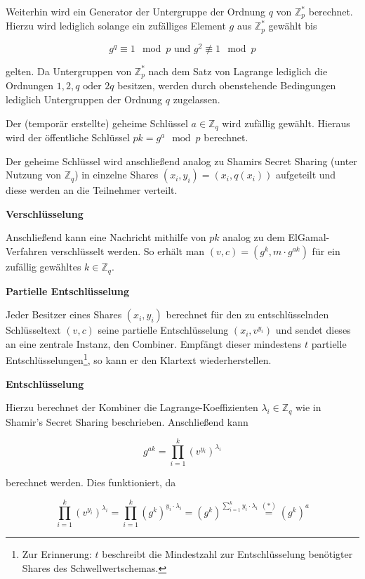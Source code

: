 Weiterhin wird ein Generator der Untergruppe der Ordnung \(q\) von \(\mathbb{Z}_p^*\) berechnet. Hierzu wird lediglich solange ein zufälliges Element \(g\) aus \(\mathbb{Z}_p^*\) gewählt bis 

\[g^q \equiv 1 \mod p \text{ und } g^2 \not\equiv 1 \mod p\] 

gelten. Da Untergruppen von \(\mathbb{Z}_p^*\) nach dem Satz von Lagrange lediglich die Ordnungen \(1,2,q \text{ oder } 2q\) besitzen, werden durch obenstehende Bedingungen lediglich Untergruppen der Ordnung \(q\) zugelassen.

Der (temporär erstellte) geheime Schlüssel \(a \in \mathbb{Z}_q\) wird zufällig gewählt. Hieraus wird der öffentliche Schlüssel \(pk = g^a \mod p\) berechnet.

Der geheime Schlüssel wird anschließend analog zu Shamirs Secret Sharing (unter Nutzung von \(\mathbb{Z}_q\)) in einzelne Shares \((x_i, y_i) = (x_i, q(x_i))\) aufgeteilt und diese werden an die Teilnehmer verteilt. 

\textbf{Verschlüsselung}

Anschließend kann eine Nachricht mithilfe von \(pk\) analog zu dem ElGamal-Verfahren verschlüsselt werden.  So erhält man \((v,c) = (g^k, m \cdot g^{ak})\) für ein zufällig gewähltes \(k \in \mathbb{Z}_q\).

\textbf{Partielle Entschlüsselung}

Jeder Besitzer eines Shares \((x_i, y_i)\) berechnet für den zu entschlüsselnden Schlüsseltext \((v,c)\) seine partielle Entschlüsselung \((x_i, v^{y_i})\) und sendet dieses an eine zentrale Instanz, den Combiner. Empfängt dieser mindestens \(t\) partielle Entschlüsselungen\footnote{
  Zur Erinnerung: \(t\) beschreibt die Mindestzahl zur Entschlüsselung benötigter Shares des Schwellwertschemas.
}, so kann er den Klartext wiederherstellen.

\textbf{Entschlüsselung}

Hierzu berechnet der Kombiner die Lagrange-Koeffizienten \(\lambda_i \in \mathbb{Z}_q\) wie in Shamir's Secret Sharing beschrieben. Anschließend kann
 
\[g^{ak} = \prod_{i=1}^k (v^{y_i})^{\lambda_i}\]

berechnet werden. Dies funktioniert, da 

\[
\prod_{i=1}^k (v^{y_i})^{\lambda_i} = 
\prod_{i=1}^k (g^k)^{y_i \cdot \lambda_i} = 
(g^k)^{\sum_{i=1}^{k} y_i \cdot \lambda_i} \overset{(*)}{=}
(g^k)^a
\]

